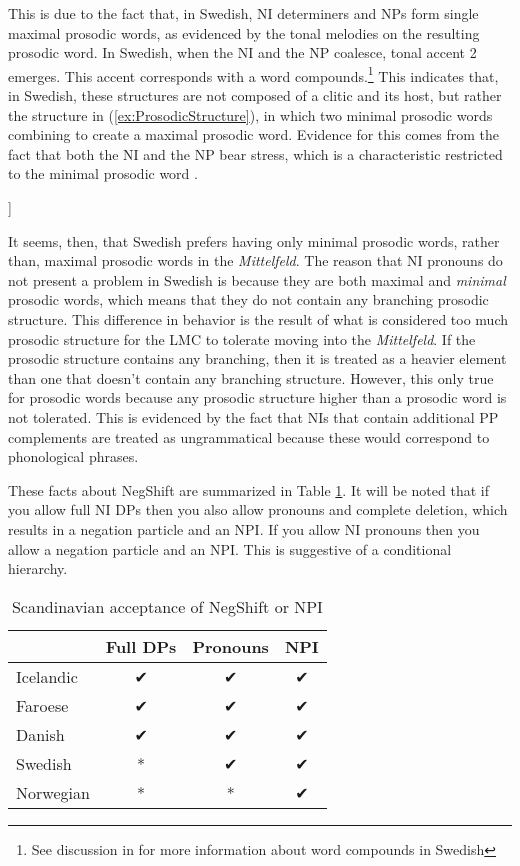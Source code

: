 \documentclass[12pt, letterpaper]{article}
\begin{document}
This is due to the fact that, in Swedish, NI determiners and NPs form single maximal prosodic words, as evidenced by the tonal melodies on the resulting prosodic word. In Swedish, when the NI and the NP coalesce, tonal accent 2 emerges. This accent corresponds with a word compounds.\footnote{See discussion in \cite{myrbergProsodicWordSwedish2013,myrbergProsodicHierarchySwedish2015} for more information about word compounds in Swedish} This indicates that, in Swedish, these structures are not composed of a clitic and its host, but rather the structure in (\ref{ex:ProsodicStructure}), in which two minimal prosodic words combining to create a maximal prosodic word. Evidence for this comes from the fact that both the NI and the NP bear stress, which is a characteristic restricted to the minimal prosodic word \citep{myrbergProsodicWordSwedish2013,myrbergProsodicHierarchySwedish2015}. 
\ea \label{ex:ProsodicStructure}
\begin{forest}
	[$\omega_{max}$
		[$\omega_{min}$\\\emph{inga}] [$\omega_{min}$\\\emph{grottor}]
	]
\end{forest} 
\z 
It seems, then, that Swedish prefers having only minimal prosodic words, rather than, maximal prosodic words in the \emph{Mittelfeld}. The reason that NI pronouns do not present a problem in Swedish is because they are both maximal and \emph{minimal} prosodic words, which means that they do not contain any branching prosodic structure. This difference in behavior is the result of what is considered too much prosodic structure for the LMC to tolerate moving into the \emph{Mittelfeld}. If the prosodic structure contains any branching, then it is treated as a heavier element than one that doesn't contain any branching structure. However, this only true for prosodic words because any prosodic structure higher than a prosodic word is not tolerated. This is evidenced by the fact that NIs that contain additional PP complements are treated as ungrammatical because these would correspond to phonological phrases. 

These facts about NegShift are summarized in Table \ref{tab:Paradigm}. It will be noted that if you allow full NI DPs then you also allow pronouns and complete deletion, which results in a negation particle and an NPI. If you allow NI pronouns then you allow a negation particle and an NPI. This is suggestive of a conditional hierarchy. 

\begin{table}[!ht]
	\centering
	\caption{Scandinavian acceptance of NegShift or NPI}
	\label{tab:Paradigm}
\begin{tabular}{lccc}
	\hline 
	& Full DPs & Pronouns & NPI\\
	\hline
	Icelandic & ✔︎ & ✔︎ & ✔︎ \\
	Faroese & ✔︎ & ✔︎ & ✔︎ \\
	Danish & ✔︎ & ✔︎ & ✔︎ \\
	Swedish & * & ✔︎ & ✔︎ \\
	Norwegian & * & * & ✔︎ \\
	\hline 
\end{tabular} 
\end{table}
\end{document}
